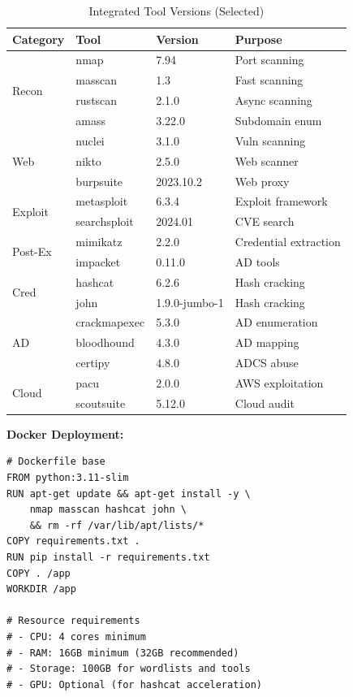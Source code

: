 \documentclass[preprint,12pt]{elsarticle}
\begin{document}
\begin{table}[htbp]
\centering
\caption{Integrated Tool Versions (Selected)}
\label{tab:tools}
\begin{tabular}{llll}
\toprule
\textbf{Category} & \textbf{Tool} & \textbf{Version} & \textbf{Purpose} \\
\midrule
\multirow{4}{*}{Recon} & nmap & 7.94 & Port scanning \\
 & masscan & 1.3 & Fast scanning \\
 & rustscan & 2.1.0 & Async scanning \\
 & amass & 3.22.0 & Subdomain enum \\
\midrule
\multirow{3}{*}{Web} & nuclei & 3.1.0 & Vuln scanning \\
 & nikto & 2.5.0 & Web scanner \\
 & burpsuite & 2023.10.2 & Web proxy \\
\midrule
\multirow{2}{*}{Exploit} & metasploit & 6.3.4 & Exploit framework \\
 & searchsploit & 2024.01 & CVE search \\
\midrule
\multirow{2}{*}{Post-Ex} & mimikatz & 2.2.0 & Credential extraction \\
 & impacket & 0.11.0 & AD tools \\
\midrule
\multirow{2}{*}{Cred} & hashcat & 6.2.6 & Hash cracking \\
 & john & 1.9.0-jumbo-1 & Hash cracking \\
\midrule
\multirow{3}{*}{AD} & crackmapexec & 5.3.0 & AD enumeration \\
 & bloodhound & 4.3.0 & AD mapping \\
 & certipy & 4.8.0 & ADCS abuse \\
\midrule
\multirow{2}{*}{Cloud} & pacu & 2.0.0 & AWS exploitation \\
 & scoutsuite & 5.12.0 & Cloud audit \\
\bottomrule
\end{tabular}
\end{table}

\textbf{Docker Deployment:}
\begin{verbatim}
# Dockerfile base
FROM python:3.11-slim
RUN apt-get update && apt-get install -y \
    nmap masscan hashcat john \
    && rm -rf /var/lib/apt/lists/*
COPY requirements.txt .
RUN pip install -r requirements.txt
COPY . /app
WORKDIR /app

# Resource requirements
# - CPU: 4 cores minimum
# - RAM: 16GB minimum (32GB recommended)
# - Storage: 100GB for wordlists and tools
# - GPU: Optional (for hashcat acceleration)
\end{verbatim}
\end{document}
